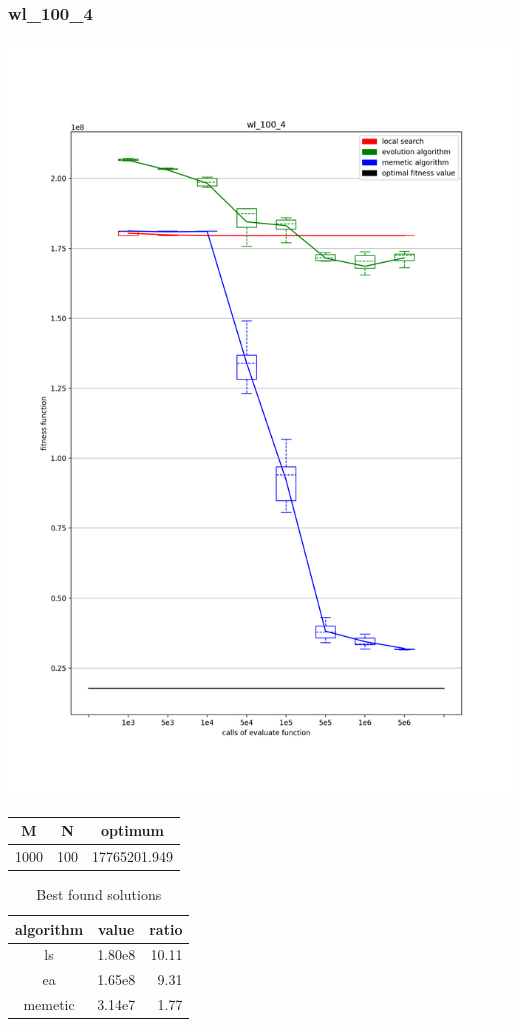 \documentclass{beamer}
\begin{document}
\begin{frame}
    \frametitle{wl\_100\_4}
    \begin{minipage}{0.5\textwidth}
        \includegraphics[width=\textwidth]{wl_100_4.png}
    \end{minipage}
    \begin{minipage}{0.4\textwidth}
        \begin{tabular}{ c | c | c }
            M & N & optimum \\
            \hline
            1000 & 100 & 17765201.949 \\
        \end{tabular}
        \begin{table}
            \centering
            \begin{tabular}{ c | c | r }
                algorithm & value & ratio \\
                \hline
                ls & 1.80e8 & 10.11\\
                ea & 1.65e8 & 9.31\\
                memetic & 3.14e7 & 1.77\\
            \end{tabular}
            \caption{Best found solutions}
        \end{table}
    \end{minipage}
\end{frame}
\end{document}
